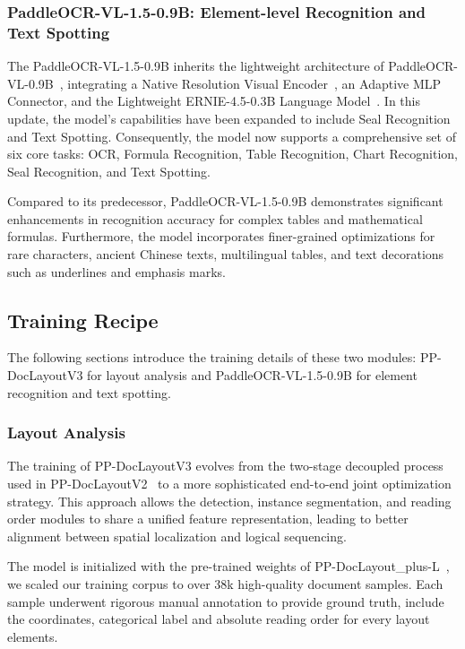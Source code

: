 \documentclass[11pt, a4paper,logo,  copyright, nonumbering]{paddleocr}
\begin{document}
\subsubsection{PaddleOCR-VL-1.5-0.9B: Element-level Recognition and Text Spotting}
\label{PaddleOCR-VL-1.5-0.9B arch}

The PaddleOCR-VL-1.5-0.9B inherits the lightweight architecture of PaddleOCR-VL-0.9B~\cite{cui2025paddleocrvl}, integrating a Native Resolution Visual Encoder~\cite{dehghani2023patch}, an Adaptive MLP Connector, and the Lightweight ERNIE-4.5-0.3B Language Model~\cite{ernie2025technicalreport}. In this update, the model's capabilities have been expanded to include Seal Recognition and Text Spotting. Consequently, the model now supports a comprehensive set of six core tasks: OCR, Formula Recognition, Table Recognition, Chart Recognition, Seal Recognition, and Text Spotting. 

Compared to its predecessor, PaddleOCR-VL-1.5-0.9B demonstrates significant enhancements in recognition accuracy for complex tables and mathematical formulas. Furthermore, the model incorporates finer-grained optimizations for rare characters, ancient Chinese texts, multilingual tables, and text decorations such as underlines and emphasis marks.


\subsection{Training Recipe}

 The following sections introduce the training details of these two modules: PP-DocLayoutV3 for layout analysis and PaddleOCR-VL-1.5-0.9B for element recognition and text spotting. 



\subsubsection{Layout Analysis}

\label{Layout Analysis}

The training of PP-DocLayoutV3 evolves from the two-stage decoupled process used in PP-DocLayoutV2~\cite{cui2025paddleocrvl} to a more sophisticated end-to-end joint optimization strategy. This approach allows the detection, instance segmentation, and reading order modules to share a unified feature representation, leading to better alignment between spatial localization and logical sequencing.

The model is initialized with the pre-trained weights of PP-DocLayout\_plus-L~\cite{sun2025pp}, we scaled our training corpus to over 38k high-quality document samples. Each sample underwent rigorous manual annotation to provide ground truth, include the coordinates, categorical label and absolute reading order for every layout elements.
\end{document}
